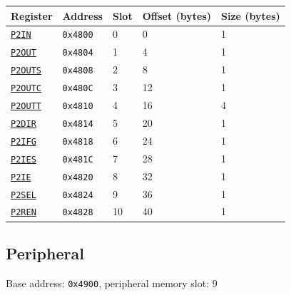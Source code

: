 \begin{tabularx}{\textwidth}{ l l l l X }
\textbf{Register} & \textbf{Address} & \textbf{Slot} & \textbf{Offset (bytes)} & \textbf{Size (bytes)} \\ \hline
\hyperref[ss:PxIN]{\texttt{P2IN}} & \texttt{0x4800} & 0 & 0 & 1 \\
\rowcolor{tablehighlightcolor} \hyperref[ss:PxOUT]{\texttt{P2OUT}} & \texttt{0x4804} & 1 & 4 & 1 \\
\hyperref[ss:PxOUTS]{\texttt{P2OUTS}} & \texttt{0x4808} & 2 & 8 & 1 \\
\rowcolor{tablehighlightcolor} \hyperref[ss:PxOUTC]{\texttt{P2OUTC}} & \texttt{0x480C} & 3 & 12 & 1 \\
\hyperref[ss:PxOUTT]{\texttt{P2OUTT}} & \texttt{0x4810} & 4 & 16 & 4 \\
\rowcolor{tablehighlightcolor} \hyperref[ss:PxDIR]{\texttt{P2DIR}} & \texttt{0x4814} & 5 & 20 & 1 \\
\hyperref[ss:PxIFG]{\texttt{P2IFG}} & \texttt{0x4818} & 6 & 24 & 1 \\
\rowcolor{tablehighlightcolor} \hyperref[ss:PxIES]{\texttt{P2IES}} & \texttt{0x481C} & 7 & 28 & 1 \\
\hyperref[ss:PxIE]{\texttt{P2IE}} & \texttt{0x4820} & 8 & 32 & 1 \\
\rowcolor{tablehighlightcolor} \hyperref[ss:PxSEL]{\texttt{P2SEL}} & \texttt{0x4824} & 9 & 36 & 1 \\
\hyperref[ss:PxREN]{\texttt{P2REN}} & \texttt{0x4828} & 10 & 40 & 1 \\
\hline
\end{tabularx}

\subsection{ Peripheral}
\noindent Base address: \texttt{0x4900}, peripheral memory slot: 9

